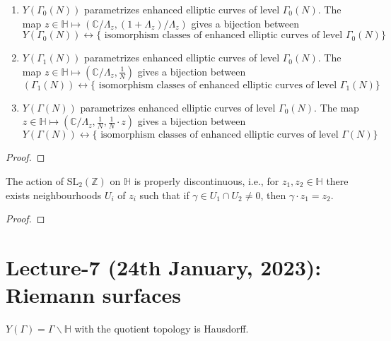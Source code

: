 \documentclass[oneside, 12pt, ]{scrbook}
\newcommand{\CC}{\mathbb C}
\newcommand{\ZZ}{\mathbb Z}
\newcommand{\SL}{\mathrm{SL}}
\newcommand{\HH}{\mathbb{H}}
\newcommand{\bs}{\backslash}
\theoremstyle{theorem}
\begin{document}
\begin{proposition}
\begin{enumerate}
\item $Y(\Gamma_{0}(N))$ parametrizes enhanced elliptic curves of level $\Gamma_{0}(N)$. The map $z\in \HH \mapsto \left( \CC/\Lambda_{z} , \left( 1 + \Lambda_{z} \right)/\Lambda_{z}\right)$ gives a bijection between 
$$Y (\Gamma_{0}(N)) \leftrightarrow \{\text{ isomorphism classes of enhanced elliptic curves of level } \Gamma_{0}(N)\}$$
\item $Y(\Gamma_{1}(N))$ parametrizes enhanced elliptic curves of level $\Gamma_{0}(N)$. The map $z\in \HH \mapsto \left( \CC/\Lambda_{z} , \frac{1}{N} \right)$ gives a bijection between 
$$ (\Gamma_{1}(N)) \leftrightarrow \{\text{ isomorphism classes of enhanced elliptic curves of level } \Gamma_{1}(N)\}$$
\item $Y(\Gamma(N))$ parametrizes enhanced elliptic curves of level $\Gamma_{0}(N)$. The map $z\in \HH \mapsto \left( \CC/\Lambda_{z} , \frac{1}{N} , \frac{1}{N} \cdot z \right)$ gives a bijection between 
$$Y (\Gamma(N)) \leftrightarrow \{\text{ isomorphism classes of enhanced elliptic curves of level } \Gamma(N)\}$$
\end{enumerate}
\end{proposition}

\begin{proof}

\end{proof}

\begin{proposition}
The action of $\SL_{2}(\ZZ)$ on $\HH$ is properly discontinuous, i.e., for $z_{1},z_{2} \in \HH$ there exists neighbourhoods $U_{i}$ of $z_{i}$ such that if $\gamma \in U_{1}\cap U_{2} \neq 0$, then $\gamma \cdot z_{1} = z_{2}$.
\end{proposition}

\begin{proof}

\end{proof}

\chapter{Lecture-7 (24th January, 2023): Riemann surfaces}

\begin{corollary}
$Y(\Gamma) = \Gamma \bs \HH$ with the quotient topology is Hausdorff.
\end{corollary}
\end{document}
